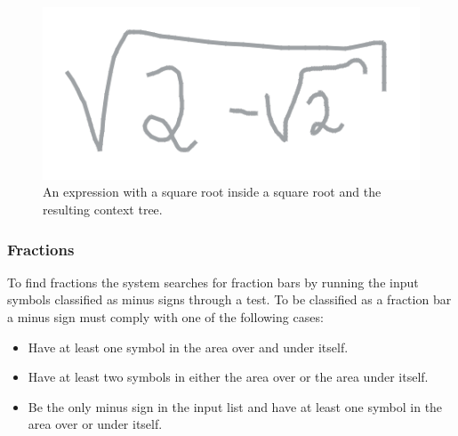 \begin{figure}[H]
\begin{center}
    \includegraphics[scale=0.5]{Assets/Chapter3_Method/interpretation-sqrt.png}
\end{center}
\centering
    \caption{An expression with a square root inside a square root and the resulting context tree.}

\label{fig:segmentation}
\end{figure}

\subsubsection{Fractions}

To find fractions the system searches for fraction bars by running the input symbols classified as minus signs through a test. To be classified as a fraction bar a minus sign must comply with one of the following cases:

\begin{itemize}
    \setlength\itemsep{0em}
    \item Have at least one symbol in the area over and under itself.
    \item Have at least two symbols in either the area over or the area under itself.
    \item Be the only minus sign in the input list and have at least one symbol in the area over or under itself.
\end{itemize}

